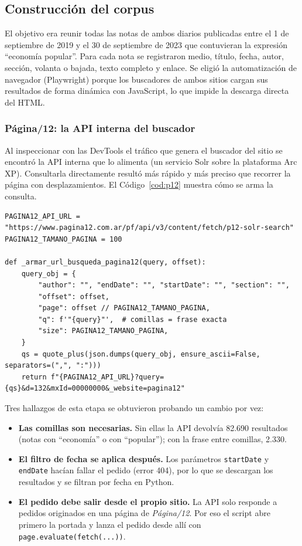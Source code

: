\documentclass[11pt,a4paper]{article}
\newcommand{\pdoce}{\textit{Página/12}}
\newcommand{\EP}{economía popular}
\begin{document}
\subsection{Construcción del corpus}

El objetivo era reunir todas las notas de ambos diarios publicadas entre el 1 de septiembre de 2019 y el 30 de septiembre de 2023 que contuvieran la expresión \enquote{\EP}. Para cada nota se registraron medio, título, fecha, autor, sección, volanta o bajada, texto completo y enlace. Se eligió la automatización de navegador (Playwright) porque los buscadores de ambos sitios cargan sus resultados de forma dinámica con JavaScript, lo que impide la descarga directa del HTML.

\subsubsection{Página/12: la API interna del buscador}

Al inspeccionar con las DevTools el tráfico que genera el buscador del sitio se encontró la API interna que lo alimenta (un servicio Solr sobre la plataforma Arc XP). Consultarla directamente resultó más rápido y más preciso que recorrer la página con desplazamientos. El Código~\ref{cod:p12} muestra cómo se arma la consulta.

\begin{lstlisting}[caption={Armado de la consulta a la API de búsqueda de \pdoce.}, label=cod:p12]
PAGINA12_API_URL = "https://www.pagina12.com.ar/pf/api/v3/content/fetch/p12-solr-search"
PAGINA12_TAMANO_PAGINA = 100

def _armar_url_busqueda_pagina12(query, offset):
    query_obj = {
        "author": "", "endDate": "", "startDate": "", "section": "",
        "offset": offset,
        "page": offset // PAGINA12_TAMANO_PAGINA,
        "q": f'"{query}"',  # comillas = frase exacta
        "size": PAGINA12_TAMANO_PAGINA,
    }
    qs = quote_plus(json.dumps(query_obj, ensure_ascii=False, separators=(",", ":")))
    return f"{PAGINA12_API_URL}?query={qs}&d=132&mxId=00000000&_website=pagina12"
\end{lstlisting}

Tres hallazgos de esta etapa se obtuvieron probando un cambio por vez:
\begin{itemize}
  \item \textbf{Las comillas son necesarias.} Sin ellas la API devolvía 82.690 resultados (notas con \enquote{economía} o con \enquote{popular}); con la frase entre comillas, 2.330.
  \item \textbf{El filtro de fecha se aplica después.} Los parámetros \texttt{startDate} y \texttt{endDate} hacían fallar el pedido (error 404), por lo que se descargan los resultados y se filtran por fecha en Python.
  \item \textbf{El pedido debe salir desde el propio sitio.} La API solo responde a pedidos originados en una página de \pdoce. Por eso el script abre primero la portada y lanza el pedido desde allí con \texttt{page.evaluate(fetch(...))}.
\end{itemize}
\end{document}
